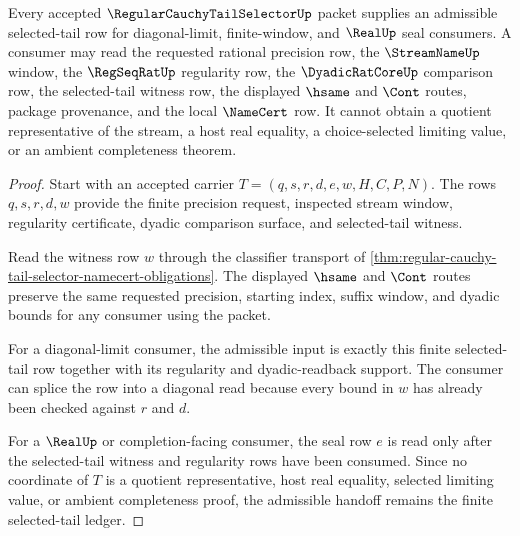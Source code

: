 \begin{theorem}
\label{thm:regular-cauchy-tail-selector-diagonal-admissibility}
Every accepted $\RegularCauchyTailSelectorUp$ packet supplies an admissible selected-tail row for diagonal-limit, finite-window, and $\RealUp$ seal consumers. A consumer may read the requested rational precision row, the $\StreamNameUp$ window, the $\RegSeqRatUp$ regularity row, the $\DyadicRatCoreUp$ comparison row, the selected-tail witness row, the displayed $\hsame$ and $\Cont$ routes, package provenance, and the local $\NameCert$ row. It cannot obtain a quotient representative of the stream, a host real equality, a choice-selected limiting value, or an ambient completeness theorem.
\end{theorem}
\begin{proof}
Start with an accepted carrier $T=(q,s,r,d,e,w,H,C,P,N)$. The rows $q,s,r,d,w$ provide the finite precision request, inspected stream window, regularity certificate, dyadic comparison surface, and selected-tail witness.

Read the witness row $w$ through the classifier transport of \autoref{thm:regular-cauchy-tail-selector-namecert-obligations}. The displayed $\hsame$ and $\Cont$ routes preserve the same requested precision, starting index, suffix window, and dyadic bounds for any consumer using the packet.

For a diagonal-limit consumer, the admissible input is exactly this finite selected-tail row together with its regularity and dyadic-readback support. The consumer can splice the row into a diagonal read because every bound in $w$ has already been checked against $r$ and $d$.

For a $\RealUp$ or completion-facing consumer, the seal row $e$ is read only after the selected-tail witness and regularity rows have been consumed. Since no coordinate of $T$ is a quotient representative, host real equality, selected limiting value, or ambient completeness proof, the admissible handoff remains the finite selected-tail ledger.
\end{proof}

